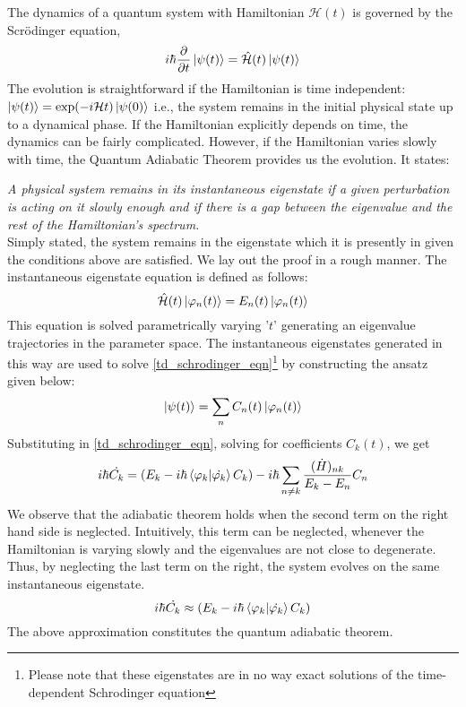 The dynamics of a quantum system with Hamiltonian $\mathcal{H}(t)$ is governed by the Scr{\"o}dinger equation,
    \begin{equation}\label{td_schrodinger_eqn}
        i\hbar\frac{\partial}{\partial t}\ket{\psi(t)} = \mathcal{\hat{H}}(t)\ket{\psi(t)}
    \end{equation}
The evolution is straightforward if the Hamiltonian is time independent: 
$\ket{\psi(t)} = \text{exp}(-i\mathcal{H}t)\ket{\psi(0)}$ i.e., the system remains in the initial physical state up to a dynamical phase. If the Hamiltonian explicitly depends on time, the dynamics can be fairly complicated. However, if the Hamiltonian varies slowly with time, the Quantum Adiabatic Theorem provides us the evolution.\cite{griffiths_schroeter_2018} It states: \par \vspace{0.4cm} \textit{A physical system remains in its instantaneous eigenstate if a given perturbation is acting on it slowly enough and if there is a gap between the eigenvalue and the rest of the Hamiltonian's spectrum.} \vspace{0.4cm} \\ 
Simply stated, the system remains in the eigenstate which it is presently in given the conditions above are satisfied. We lay out the proof in a rough manner. The instantaneous eigenstate equation is defined as follows:
    \begin{equation}
        \mathcal{\hat{H}}(t)\ket{\varphi_n(t)} = E_n(t)\ket{\varphi_n(t)}
    \end{equation}
This equation is solved parametrically varying '$t$' generating an eigenvalue trajectories in the parameter space. The instantaneous eigenstates generated in this way are used to solve \eqref{td_schrodinger_eqn}\footnote{Please note that these eigenstates are in no way exact solutions of the time-dependent Schrodinger equation} by constructing the ansatz given below:
    \begin{equation}
        \ket{\psi(t)} = \sum_n C_n(t) \ket{\varphi_n(t)}
    \end{equation}
Substituting in \eqref{td_schrodinger_eqn}, solving for coefficients $C_k(t)$, we get
    \begin{equation}
         i\hbar\Dot{C_k} = \left(E_k -i\hbar\bra{\varphi_k}\ket{\Dot{\varphi _k}}C_k\right) -i\hbar\sum_{n\neq k}\frac{(\Dot{H})_{nk}}{E_k-E_n}C_n
    \end{equation}
We observe that the adiabatic theorem holds when the second term on the right hand side is neglected. Intuitively, this term can be neglected, whenever the Hamiltonian is varying slowly and the eigenvalues are not close to degenerate. Thus, by neglecting the last term on the right, the system evolves on the same instantaneous eigenstate. 
    \begin{equation}
         i\hbar\Dot{C_k} \approx \left(E_k -i\hbar\bra{\varphi_k}\ket{\Dot{\varphi _k}}C_k\right) 
    \end{equation}
The above approximation constitutes the quantum adiabatic theorem. 
